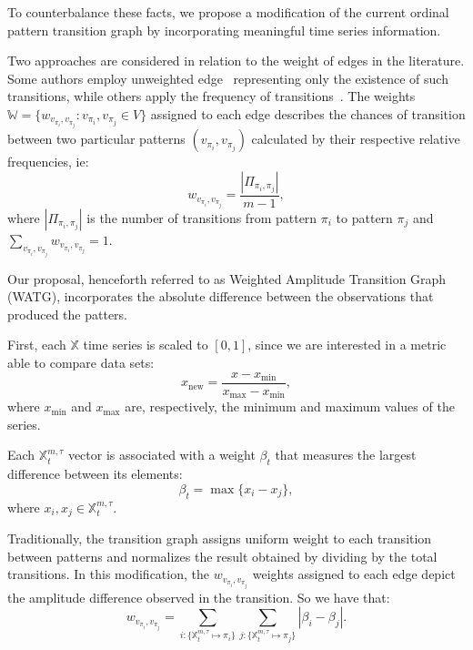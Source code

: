 \documentclass{isprs}
\begin{document}
	To counterbalance these facts, we propose a modification of the current ordinal pattern transition graph by incorporating meaningful time series information.
	
	Two approaches are considered in relation to the weight of edges in the literature.
	Some authors employ unweighted edge~\citep{McCullough2015lagged, Kulp2016ordinal} representing only the existence of such transitions, while others apply the frequency of transitions~\citep{Sorrentino2015periodic, Zhang2017ConstructingOP}.
	The weights $\mathbb{W} = \{w_{v_{\pi_i}, v_{\pi_j}}: v_{\pi_i}, v_{\pi_j} \in V \}$ assigned to each edge describes the chances of transition between two particular patterns $(v_{\pi_i}, v_{\pi_j})$ calculated by their respective relative frequencies, ie:	
	\begin{equation}
	w_{v_{\pi_i}, v_{\pi_j}} = \frac{|\Pi_{\pi_i,\pi_j}|}{m-1},
	\end{equation}
	where $|\Pi_{\pi_i,\pi_j}|$ is the number of transitions from pattern $\pi_i$ to pattern $\pi_j$ and $\sum_{v_{\pi_i}, v_{\pi_j}}w_{v_{\pi_i}, v_{\pi_j}} = 1$.
	
	Our proposal, henceforth referred to as Weighted Amplitude Transition Graph (WATG), incorporates the absolute difference between the observations that produced the patters.
	
	First, each $\mathbb{X}$ time series is scaled to $[0, 1]$, since we are interested in a metric able to compare data sets:
	\begin{equation}
	x_{\text{new}} = \frac{x - x_{\min}}{x_{\max} - x_{\min}},
	\end{equation}
	where $x_{\min}$ and $x_{\max}$ are, respectively, the minimum and maximum values of the series.
	
	Each $\mathbb{X}^{m, \tau}_t$ vector is associated with a weight $\beta_t$ that measures the largest difference between its elements:
	\begin{equation}
	\beta_t = \max\{x_i - x_j\},
	\end{equation}
	where $x_i, x_j \in \mathbb{X}^{m, \tau}_t$.
	
	Traditionally, the transition graph assigns uniform weight to each transition between patterns and normalizes the result obtained by dividing by the total transitions.
	In this modification, the $w_{v_{\pi_i}, v_{\pi_j}}$ weights assigned to each edge depict the amplitude difference observed in the transition.
	So we have that:	
	\begin{equation}
	w_{v_{\pi_i}, v_{\pi_j}} =  \sum_{i : \{\mathbb{X}^{m,\tau}_t \mapsto \pi_i\}} \sum_{j : \{\mathbb{X}^{m,\tau}_t \mapsto \pi_j\}} |\beta_i - \beta_j| .
	\end{equation}
	
\end{document}
